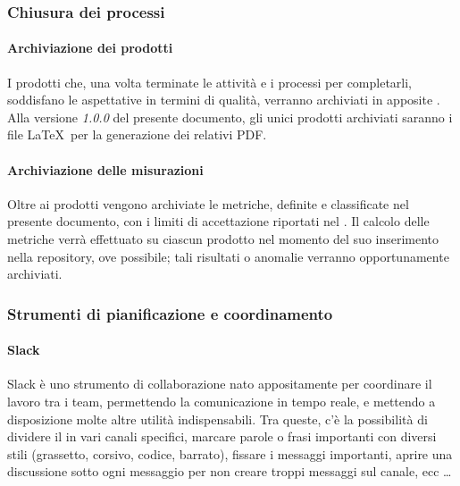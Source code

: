 
		\subsubsection{Chiusura dei processi}

    		\paragraph{Archiviazione dei prodotti}
			I prodotti che, una volta terminate le attività e i processi per completarli, soddisfano le aspettative in termini di qualità,
			verranno archiviati in apposite . Alla versione \textit{1.0.0} del presente documento, gli unici prodotti archiviati saranno i file \LaTeX\ per la generazione dei relativi PDF.

    		\paragraph{Archiviazione delle misurazioni}
			Oltre ai prodotti vengono archiviate le metriche, definite e classificate nel presente documento, con i limiti di accettazione riportati nel \Doc{\PdQv}.
			Il calcolo delle metriche verrà effettuato su ciascun prodotto nel momento del suo inserimento nella repository, ove possibile; tali risultati o anomalie verranno opportunamente archiviati. %

    	\subsubsection{Strumenti di pianificazione e coordinamento}\label{pianificazione e coordinamento}

    		\paragraph{Slack}
			Slack è uno strumento di collaborazione nato appositamente per coordinare il lavoro tra i team, permettendo la comunicazione in tempo
			reale, e mettendo a disposizione molte altre utilità indispensabili. Tra queste, c'è la possibilità di dividere il  in vari canali specifici, marcare parole o frasi importanti con diversi stili (grassetto, corsivo, codice, barrato), fissare i messaggi importanti, aprire una discussione sotto ogni messaggio per non creare troppi messaggi sul canale, ecc \dots
			
